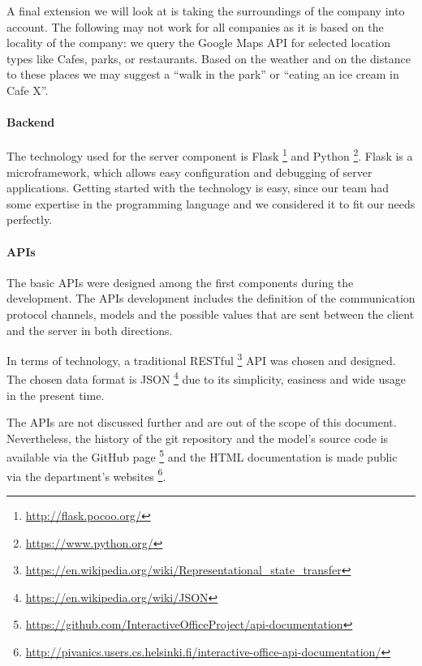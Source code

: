 A final extension we will look at is taking the surroundings of the company into account. The following may not work 
for all companies as it is based on the locality of the company: we query the Google Maps API for selected location 
types like Cafes, parks, or restaurants. Based on the weather and on the distance to these places we may suggest a 
``walk in the park'' or  ``eating an ice cream in Cafe X''.

\paragraph{Backend}
The technology used for the server component is Flask \footnote{\url{http://flask.pocoo.org/}} and Python \footnote{\url{https://www.python.org/}}. 
Flask is a microframework, which allows easy configuration and debugging of server applications. Getting started with 
the technology is easy, since our team had some expertise in the programming language and we considered it to fit our 
needs perfectly. 

\paragraph{APIs}
The basic APIs were designed among the first components during the development. The APIs development includes the 
definition of the communication protocol channels, models and the possible values that are sent between the client and 
the server in both directions. 

In terms of technology, a traditional RESTful \footnote{\url{https://en.wikipedia.org/wiki/Representational\_state\_transfer}} 
API was chosen and designed. The chosen data format is JSON \footnote{\url{https://en.wikipedia.org/wiki/JSON}} due to 
its simplicity, easiness and wide usage in the present time. 

The APIs are not discussed further and are out of the scope of this document. Nevertheless, the history of the git 
repository and the model's source code is available via the GitHub page \footnote{\url{https://github.com/InteractiveOfficeProject/api-documentation}} 
and the HTML documentation is made public via the department's websites \footnote{\url{http://pivanics.users.cs.helsinki.fi/interactive-office-api-documentation/}}. 